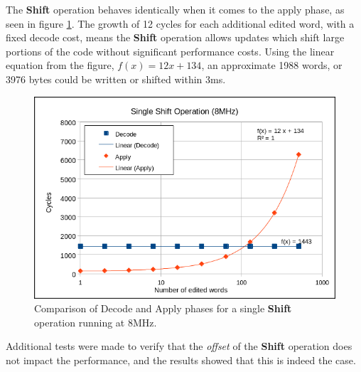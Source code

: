 The \textbf{Shift} operation behaves identically when it comes to the apply phase, as seen in figure \ref{fig:sDecodeVsApply}. The growth of 12 cycles for each additional edited word, with a fixed decode cost, means the \textbf{Shift} operation allows updates which shift large portions of the code without significant performance costs. Using the linear equation from the figure, $f(x)=12x+134$, an approximate 1988 words, or 3976 bytes could be written or shifted within 3ms. 
\begin{figure}[!ht]
    \begin{shaded}
        \centering
        \includegraphics[width=\figurewidth]{img/SDecodeVsApply.png}
        \caption{Comparison of Decode and Apply phases for a single \textbf{Shift} operation running at 8MHz.}
        \label{fig:sDecodeVsApply}
    \end{shaded}
\end{figure}
Additional tests were made to verify that the \textit{offset} of the \textbf{Shift} operation does not impact the performance, and the results showed that this is indeed the case. 

